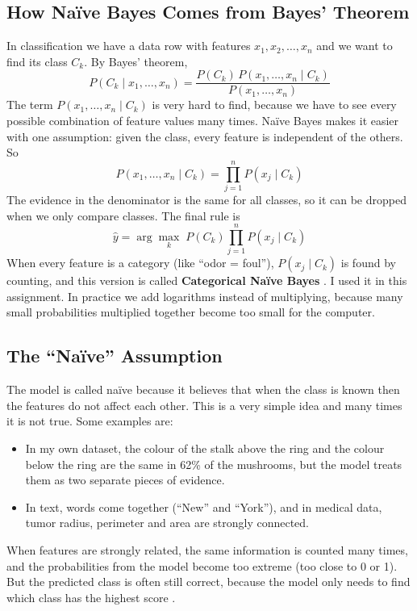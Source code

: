 \documentclass[12pt,a4paper]{article}
\begin{document}
\subsection{How Na\"ive Bayes Comes from Bayes' Theorem}
In classification we have a data row with features $x_1,x_2,\dots,x_n$ and we want to find its class $C_k$. By Bayes' theorem,
\begin{equation}
P(C_k \mid x_1,\dots,x_n) = \frac{P(C_k)\,P(x_1,\dots,x_n \mid C_k)}{P(x_1,\dots,x_n)}
\end{equation}
The term $P(x_1,\dots,x_n \mid C_k)$ is very hard to find, because we have to see every possible combination of feature values many times. Na\"ive Bayes makes it easier with one assumption: given the class, every feature is independent of the others. So
\begin{equation}
P(x_1,\dots,x_n \mid C_k) = \prod_{j=1}^{n} P(x_j \mid C_k)
\end{equation}
The evidence in the denominator is the same for all classes, so it can be dropped when we only compare classes. The final rule is
\begin{equation}
\hat{y} = \arg\max_{k}\; P(C_k)\prod_{j=1}^{n} P(x_j \mid C_k)
\end{equation}
When every feature is a category (like ``odor = foul''), $P(x_j\mid C_k)$ is found by counting, and this version is called \textbf{Categorical Na\"ive Bayes} \cite{mitchell1997}. I used it in this assignment. In practice we add logarithms instead of multiplying, because many small probabilities multiplied together become too small for the computer.

\subsection{The ``Na\"ive'' Assumption}
The model is called na\"ive because it believes that when the class is known then the features do not affect each other. This is a very simple idea and many times it is not true. Some examples are:
\begin{itemize}
  \item In my own dataset, the colour of the stalk above the ring and the colour below the ring are the same in 62\% of the mushrooms, but the model treats them as two separate pieces of evidence.
  \item In text, words come together (``New'' and ``York''), and in medical data, tumor radius, perimeter and area are strongly connected.
\end{itemize}
When features are strongly related, the same information is counted many times, and the probabilities from the model become too extreme (too close to 0 or 1). But the predicted class is often still correct, because the model only needs to find which class has the highest score \cite{zhang2004}.
\end{document}
